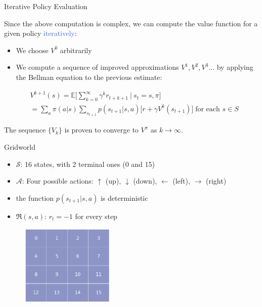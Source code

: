 \documentclass{beamer}
\begin{document}
\begin{frame}{Iterative Policy Evaluation}

Since the above computation is complex, we can compute the value function for a given policy \textcolor{RoyalBlue}{iteratively}:
\begin{itemize}
    \item We choose $V^0$ arbitrarily
    \item We compute a sequence of improved approximations $V^1, V^2, V^3 ...$  by applying the Bellman equation to the previous estimate:
\end{itemize}

\begin{align*}
    &V^{k+1}(s) = \mathds{E} \bigg[\sum_{k=0}^{\infty}\gamma^{k} r_{t+k+1} \: \bigg| \: s_t=s,\pi \bigg] \\
		   & = \sum_a \pi(a|s) \sum_{s_{t+1}} p(s_{t+1}|s,a)\big[r + \gamma V^{k}(s_{t+1}) \big] \; \text{for each } s \in S
\end{align*}

The sequence $\{V_k\}$ is proven to converge to $V^{\pi}$ as $k \rightarrow \infty $.

\end{frame}



\begin{frame}{Gridworld}

\begin{itemize}
    \item $\mathcal{S}$: 16 states, with 2 terminal ones (0 and 15)
    \item $\mathcal{A}$: Four possible actions: $\uparrow$ (up), $\downarrow$ (down), $\leftarrow$ (left), $\rightarrow$ (right)
    \item the function $p(s_{t+1}|s,a)$ is deterministic
\item $\Re(s,a)$: $r_t = -1$ for every step
\end{itemize}

\begin{figure}[t]
\includegraphics[width=4.5cm]{./images/GridWorld.png}
\centering
\end{figure}


\end{frame}
\end{document}
